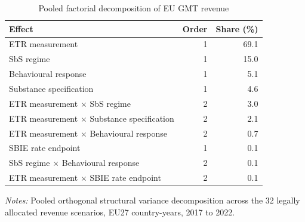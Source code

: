 \begin{table}[H]
\centering
\small
\caption[Pooled factorial decomposition of EU GMT revenue]{Pooled factorial decomposition of EU GMT revenue}
\label{tab:stage4_6_anova_updated}
\begin{tabular}{@{}lrr@{}}
\toprule
Effect & Order & Share (\%) \\
\midrule
ETR measurement & 1 & 69.1 \\
SbS regime & 1 & 15.0 \\
Behavioural response & 1 &  5.1 \\
Substance specification & 1 &  4.6 \\
ETR measurement $\times$ SbS regime & 2 &  3.0 \\
ETR measurement $\times$ Substance specification & 2 &  2.1 \\
ETR measurement $\times$ Behavioural response & 2 &  0.7 \\
SBIE rate endpoint & 1 &  0.1 \\
SbS regime $\times$ Behavioural response & 2 &  0.1 \\
ETR measurement $\times$ SBIE rate endpoint & 2 &  0.1 \\
\bottomrule
\end{tabular}

\vspace{0.5em}
\begin{minipage}{0.96\textwidth}
\footnotesize\raggedright \textit{Notes:} Pooled orthogonal structural variance decomposition across the 32 legally allocated revenue scenarios, EU27 country-years, 2017 to 2022.
\end{minipage}
\end{table}
